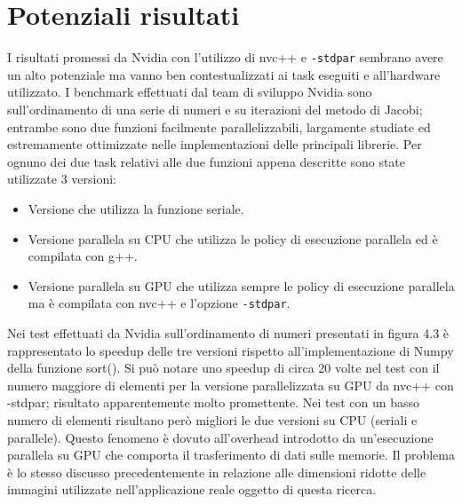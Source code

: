 \documentclass[12pt,a4paper]{report}
\begin{document}
\section{Potenziali risultati}

I risultati promessi da Nvidia con l'utilizzo di nvc++ e \verb|-stdpar| sembrano avere un alto potenziale ma vanno ben contestualizzati ai task eseguiti e all'hardware utilizzato. \newline
I benchmark effettuati dal team di sviluppo Nvidia sono sull'ordinamento di una serie di numeri e su iterazioni del metodo di Jacobi; entrambe sono due funzioni facilmente parallelizzabili, largamente studiate ed estremamente ottimizzate nelle implementazioni delle principali librerie.
Per ognuno dei due task relativi alle due funzioni appena descritte sono state utilizzate 3 versioni:
\begin{itemize}
\item Versione che utilizza la funzione seriale.
\item Versione parallela su CPU che utilizza le policy di esecuzione parallela ed è compilata con g++.
\item Versione parallela su GPU che utilizza sempre le policy di esecuzione parallela ma è compilata con nvc++ e l'opzione \verb|-stdpar|.
\end{itemize}

Nei test effettuati da Nvidia sull'ordinamento di numeri presentati in figura 4.3 è rappresentato lo speedup delle tre versioni rispetto all'implementazione di Numpy della funzione sort(). Si può notare uno speedup di circa 20 volte nel test con il numero maggiore di elementi per la versione parallelizzata su GPU da nvc++ con -stdpar; risultato apparentemente molto promettente. Nei test con un basso numero di elementi risultano però migliori le due versioni su CPU (seriali e parallele). Questo fenomeno è dovuto all'overhead introdotto da un'esecuzione parallela su GPU che comporta il trasferimento di dati sulle memorie. Il problema è lo stesso discusso precedentemente in relazione alle dimensioni ridotte delle immagini utilizzate nell'applicazione reale oggetto di questa ricerca.
\end{document}
